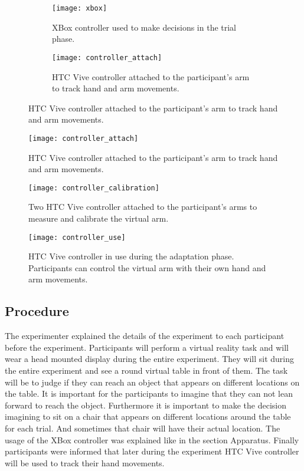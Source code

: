 \begin{figure}[h]
\centering
\begin{subfigure}{.5\textwidth}
  \texttt{[image: xbox]}
  \caption{XBox controller used to make decisions in the trial phase.} 
  \label{fig:xbox}
\end{subfigure}%
\begin{subfigure}{.5\textwidth}
  \texttt{[image: controller\_attach]}
  \caption{HTC Vive controller attached to the participant's arm to track hand and arm movements.}
  \label{fig:controller_attach}
\end{subfigure}%
\end{figure}

\begin{figure}[h]
\centering
\texttt{[image: controller\_attach]}
\caption{HTC Vive controller attached to the participant's arm to track hand and arm movements.}
\label{fig:controller_attach}
\end{figure}

\begin{figure}[h]
\centering
\texttt{[image: controller\_calibration]}
\caption{Two HTC Vive controller attached to the participant's arms to measure and calibrate the virtual arm.}
\label{fig:controller_attach}
\end{figure}

\begin{figure}[h]
\centering
\texttt{[image: controller\_use]}
\caption{HTC Vive controller in use during the adaptation phase. Participants can control the virtual arm with their own hand and arm movements.}
\label{fig:controller_attach}
\end{figure}

\newpage

\subsection{Procedure}
The experimenter explained the details of the experiment to each participant before the experiment. Participants will perform a virtual reality task and will wear a head mounted display during the entire experiment. They will sit during the entire experiment and see a round virtual table in front of them. The task will be to judge if they can reach an object that appears on different locations on the table. It is important for the participants to imagine that they can not lean forward to reach the object. Furthermore it is important to make the decision imagining to sit on a chair that appears on different locations around the table for each trial. And sometimes that chair will have their actual location. The usage of the XBox controller was explained like in the section Apparatus. Finally participants were informed that later during the experiment HTC Vive controller will be used to track their hand movements.


